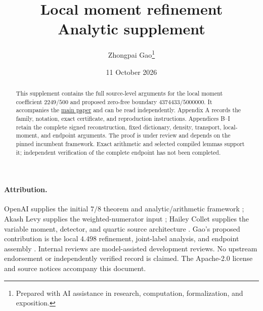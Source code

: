 \documentclass[11pt]{article}
\title{Local moment refinement\\[5pt]\large Analytic supplement}
\author{Zhongpai Gao\thanks{Prepared with AI assistance in research, computation, formalization, and exposition.}}
\date{11 October 2026}
\theoremstyle{definition}
\begin{document}
\maketitle
\begin{abstract}
This supplement contains the full source-level arguments for the local
moment coefficient $2249/500$ and proposed zero-free boundary
$4374433/5000000$. It accompanies the
\href{paper.pdf}{main paper} and can be read independently. Appendix A
records the family, notation, exact certificate, and reproduction
instructions. Appendices B--I retain the complete signed reconstruction,
fixed dictionary, density, transport, local-moment, and endpoint arguments.
The proof is under review and depends on the pinned incumbent framework.
Exact arithmetic and selected compiled lemmas support it; independent
verification of the complete endpoint has not been completed.
\end{abstract}
\paragraph{Attribution.}
OpenAI supplies the initial $7/8$ theorem and analytic/arithmetic framework
\cite{openai}; Akash Levy supplies the weighted-numerator input
\cite{levy}; Hailey Collet supplies the variable moment, detector, and
quartic source architecture \cite{collet}. Gao's proposed contribution is
the local $4.498$ refinement, joint-label analysis, and endpoint assembly
\cite{gao,gaov2}. Internal reviews are model-assisted development reviews.
No upstream endorsement or independently verified record is claimed.
The Apache-2.0 license and source notices accompany this document.
\clearpage
\tableofcontents
\clearpage
\appendix


\clearpage

\clearpage

\clearpage

\clearpage

\clearpage

\clearpage

\clearpage

\clearpage

\clearpage

\end{document}
